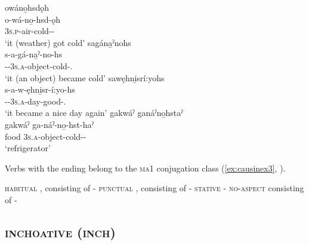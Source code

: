 \ea\label{ex:causinex}
\ea owáno̱hsdǫh\\
\gll o-wá-no̱-hsd-ǫh\\
 \textsc{3s.p}-air-cold-{\cause}-\exsc{\stative}\\
\glt `it (weather) got cold'
\ex sagána̱ˀnohs\\
\gll s-a-gá-na̱ˀ-no-hs\\
 {\repetitive}-{\factual}-\textsc{3s.a}-object-cold-{\causative}.{\zeropunctual}\\
\glt `it (an object) became cold'
\ex sawęhni̱srí:yohs\\
\gll s-a-w-ęhni̱sr-í:yo-hs\\
 {\repetitive}-{\factual}-\textsc{3s.a}-day-good-{\causative}.{\zeropunctual}\\
\glt `it became a nice day again'
\ex gakwáˀ ganáˀno̱hstaˀ\\
\gll gakwáˀ ga-náˀ-no̱-hst-haˀ\\
 food \textsc{3s.a}-object-cold-{\cause}-{\habitual}\\
\glt ‘refrigerator’
\z
\z

Verbs with the  ending belong to the \textsc{ma1} conjugation class (\ref{ex:causinex3}, ).

\ea\label{ex:causinex3} 
\ea \textsc{habitual} , consisting of  {\causative}-{\habitual}
\ex \textsc{punctual} , consisting of  {\causative}-{\zeropunctual}
\ex \textsc{stative}  {\causative}-{\stative}
\ex \textsc{no-aspect}  consisting of  {\causative}-{\noaspect}
\z
\z




\subsection{ \textsc{inchoative} (\textsc{inch})} \label{[-ˀ] (inchoative)}

